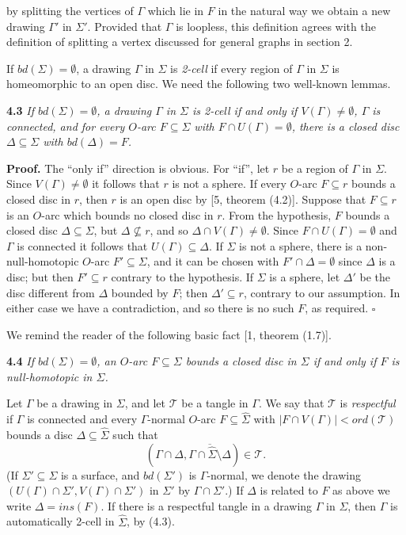 \noindent by splitting the vertices of $\Gamma$ which lie in $F$ in the natural way we obtain a new drawing $\Gamma'$ in $\Sigma'$. Provided that $\Gamma$ is loopless, this definition agrees with the definition of splitting a vertex discussed for general graphs in section 2.

If $bd(\Sigma) = \emptyset$, a drawing $\Gamma$ in $\Sigma$ is \textit{2-cell} if every region of $\Gamma$ in $\Sigma$ is homeomorphic to an open disc. We need the following two well-known lemmas.

\textbf{4.3} \textit{If $bd(\Sigma) = \emptyset$, a drawing $\Gamma$ in $\Sigma$ is 2-cell if and only if $V(\Gamma) \ne \emptyset$, $\Gamma$ is connected, and for every $O$-arc $F \subseteq \Sigma$ with $F \cap U(\Gamma) = \emptyset$, there is a closed disc $\Delta \subseteq \Sigma$ with $bd(\Delta) = F$.}

\textbf{Proof.} The ``only if'' direction is obvious. For ``if'', let $r$ be a region of $\Gamma$ in $\Sigma$. Since $V(\Gamma) \ne \emptyset$ it follows that $r$ is not a sphere. If every $O$-arc $F \subseteq r$ bounds a closed disc in $r$, then $r$ is an open disc by [5, theorem (4.2)]. Suppose that $F \subseteq r$ is an $O$-arc which bounds no closed disc in $r$. From the hypothesis, $F$ bounds a closed disc $\Delta \subseteq \Sigma$, but $\Delta \not\subseteq r$, and so $\Delta \cap V(\Gamma) \ne \emptyset$. Since $F \cap U(\Gamma) = \emptyset$ and $\Gamma$ is connected it follows that $U(\Gamma) \subseteq \Delta$. If $\Sigma$ is not a sphere, there is a non-null-homotopic $O$-arc $F' \subseteq \Sigma$, and it can be chosen with $F' \cap \Delta = \emptyset$ since $\Delta$ is a disc; but then $F' \subseteq r$ contrary to the hypothesis. If $\Sigma$ is a sphere, let $\Delta'$ be the disc different from $\Delta$ bounded by $F$; then $\Delta' \subseteq r$, contrary to our assumption. In either case we have a contradiction, and so there is no such $F$, as required. $\square$

We remind the reader of the following basic fact [1, theorem (1.7)].

\textbf{4.4} \textit{If $bd(\Sigma) = \emptyset$, an $O$-arc $F \subseteq \Sigma$ bounds a closed disc in $\Sigma$ if and only if $F$ is null-homotopic in $\Sigma$.}

Let $\Gamma$ be a drawing in $\Sigma$, and let $\mathcal{T}$ be a tangle in $\Gamma$. We say that $\mathcal{T}$ is \textit{respectful} if $\Gamma$ is connected and every $\Gamma$-normal $O$-arc $F \subseteq \hat{\Sigma}$ with $|F \cap V(\Gamma)| < ord(\mathcal{T})$ bounds a disc $\Delta \subseteq \hat{\Sigma}$ such that
\begin{equation*}
(\Gamma \cap \Delta, \overline{\Gamma \cap \hat{\Sigma} \setminus \Delta}) \in \mathcal{T}.
\end{equation*}
(If $\Sigma' \subseteq \Sigma$ is a surface, and $bd(\Sigma')$ is $\Gamma$-normal, we denote the drawing $(U(\Gamma) \cap \Sigma', V(\Gamma) \cap \Sigma')$ in $\Sigma'$ by $\Gamma \cap \Sigma'$.) If $\Delta$ is related to $F$ as above we write $\Delta = ins(F)$. If there is a respectful tangle in a drawing $\Gamma$ in $\Sigma$, then $\Gamma$ is automatically 2-cell in $\hat{\Sigma}$, by (4.3).

